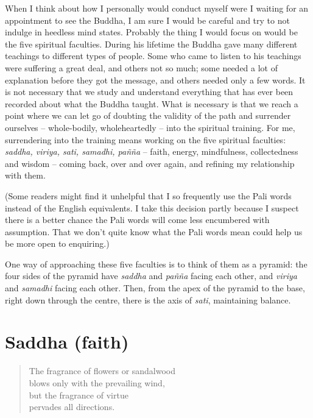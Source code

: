 When I think about how I personally would conduct myself were I waiting
for an appointment to see the Buddha, I am sure I would be careful and
try to not indulge in heedless mind states. Probably the thing I would
focus on would be the five spiritual faculties. During his lifetime the
Buddha gave many different teachings to different types of people. Some
who came to listen to his teachings were suffering a great deal, and
others not so much; some needed a lot of explanation before they got the
message, and others needed only a few words. It is not necessary that we
study and understand everything that has ever been recorded about what
the Buddha taught. What is necessary is that we reach a point where we
can let go of doubting the validity of the path and surrender ourselves
-- whole-bodily, wholeheartedly -- into the spiritual training. For me,
surrendering into the training means working on the five spiritual
faculties: \emph{saddha, viriya, sati, samadhi, pañña} -- faith, energy,
mindfulness, collectedness and wisdom -- coming back, over and over
again, and refining my relationship with them.

(Some readers might find it unhelpful that I so frequently use the Pali
words instead of the English equivalents. I take this decision partly
because I suspect there is a better chance the Pali words will come less
encumbered with assumption. That we don't quite know what the Pali words
mean could help us be more open to enquiring.)

One way of approaching these five faculties is to think of them as a
pyramid: the four sides of the pyramid have \emph{saddha} and
\emph{pañña} facing each other, and \emph{viriya} and \emph{samadhi}
facing each other. Then, from the apex of the pyramid to the base, right
down through the centre, there is the axis of \emph{sati}, maintaining
balance.

\section{Saddha (faith)}

\begin{quote}
  The fragrance of flowers or sandalwood\\
  blows only with the prevailing wind,\\
  but the fragrance of virtue\\
  pervades all directions.

\end{quote}

